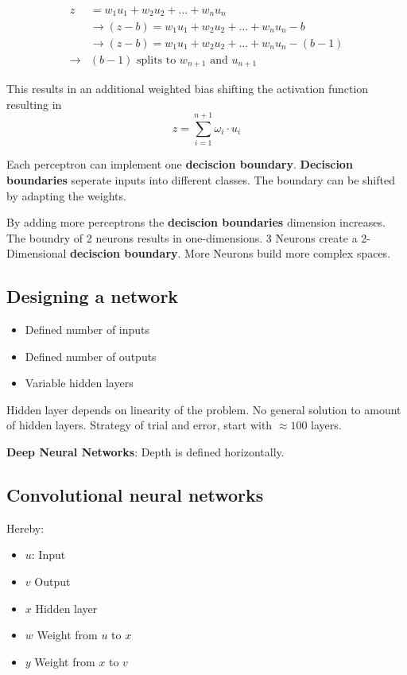 \documentclass[
    fontsize      = 11pt,
    paper         = a4,
    twoside       = false,
    parskip       = half,
    pagesize      = false,
]{scrartcl}
\providecommand{\tightlist}{%
  \setlength{\itemsep}{0pt}\setlength{\parskip}{0pt}}
\begin{document}
\begin{align*}
z &= w_1u_1 + w_2u_2 + \ldots + w_nu_n \\
& \rightarrow (z-b) = w_1u_1 + w_2u_2 + \ldots + w_nu_n - b\\
& \rightarrow (z-b) = w_1u_1 + w_2u_2 + \ldots + w_nu_n - (b-1)\\[2ex]
\rightarrow & (b-1) \text{ splits to } w_{n+1} \text{ and } u_{n+1}
\end{align*}

This results in an additional weighted bias shifting the activation
function resulting in \[z = \sum_{i=1}^{n+1}\omega_i \cdot u_i\]

Each perceptron can implement one \textbf{deciscion boundary}.
\textbf{Deciscion boundaries} seperate inputs into different classes.
The boundary can be shifted by adapting the weights.

By adding more perceptrons the \textbf{deciscion boundaries} dimension
increases. The boundry of 2 neurons results in one-dimensions. 3 Neurons
create a 2-Dimensional \textbf{deciscion boundary}. More Neurons build
more complex spaces.

\hypertarget{designing-a-network}{%
\subsection{Designing a network}\label{designing-a-network}}

\begin{itemize}
\tightlist
\item
  Defined number of inputs
\item
  Defined number of outputs
\item
  Variable hidden layers
\end{itemize}

Hidden layer depends on linearity of the problem. No general solution to
amount of hidden layers. Strategy of trial and error, start with
\(\approx 100\) layers.

\textbf{Deep Neural Networks}: Depth is defined horizontally.

\hypertarget{convolutional-neural-networks}{%
\subsection{Convolutional neural
networks}\label{convolutional-neural-networks}}

Hereby:

\begin{itemize}
\tightlist
\item
  \(u\): Input
\item
  \(v\) Output
\item
  \(x\) Hidden layer
\item
  \(w\) Weight from \(u\) to \(x\)
\item
  \(y\) Weight from \(x\) to \(v\)
\end{itemize}
\end{document}
